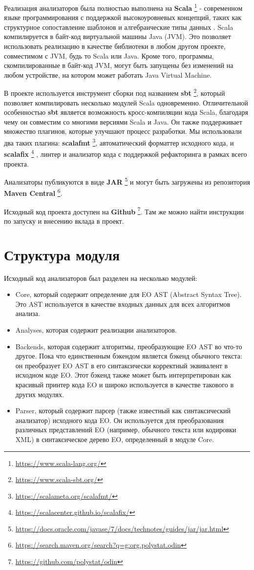 Реализация анализаторов была полностью выполнена на \textbf{Scala} \footnote{\url{https://www.scala-lang.org/}} - современном языке программирования с поддержкой высокоуровневых концепций, таких как структурное сопоставление шаблонов \cite{pattern_matching} и алгебраические типы данных \cite{adts}. Scala компилируется в байт-код виртуальной машины Java (JVM). Это позволяет использовать реализацию в качестве библиотеки в любом другом проекте, совместимом с JVM, будь то Scala или Java. Кроме того, программы, скомпилированные в байт-код JVM, могут быть запущены без изменений на любом устройстве, на котором может работать Java Virtual Machine.

В проекте используется инструмент сборки под названием \textbf{sbt} \footnote{\url{https://www.scala-sbt.org/}}, который позволяет компилировать несколько модулей Scala одновременно. Отличительной особенностью \textbf{sbt} является возможность кросс-компиляции кода Scala, благодаря чему он совместим со многими версиями Scala и Java. Он также поддерживает множество плагинов, которые улучшают процесс разработки. Мы использовали два таких плагина: \textbf{scalafmt} \footnote{\url{https://scalameta.org/scalafmt/}}, автоматический форматтер исходного кода, и \textbf{scalafix} \footnote{\url{https://scalacenter.github.io/scalafix/}} , линтер и анализатор кода с поддержкой рефакторинга в рамках всего проекта.

Анализаторы публикуются в виде \textbf{JAR} \footnote{\url{https://docs.oracle.com/javase/7/docs/technotes/guides/jar/jar.html}} и могут быть загружены из репозитория \textbf{Maven Central} \footnote{\url{https://search.maven.org/search?q=g:org.polystat.odin}}.

Исходный код проекта доступен на \textbf{Github} \footnote{\url{https://github.com/polystat/odin}}. Там же можно найти инструкции по запуску и внесению вклада в проект.


\section{Структура модуля}
\label{met:module_structure}
Исходный код анализаторов был разделен на несколько модулей:
\begin{itemize}
    \item Core, который содержит определение для EO AST (Abstract Syntax Tree).
          Это AST используется в качестве входных данных для всех алгоритмов анализа.
    \item Analyses, которая содержит реализации анализаторов.
    \item Backends, которая содержит алгоритмы, преобразующие EO AST во что-то другое. Пока что единственным бэкендом является бэкенд обычного текста: он преобразует EO AST в его синтаксически корректный эквивалент в исходном коде EO. Этот бэкенд также может быть интерпретирован как красивый принтер кода EO и широко используется в качестве такового в других модулях.
    \item Parser, который содержит парсер (также известный как синтаксический анализатор) исходного кода EO. Он используется для преобразования различных представлений EO (например, обычного текста или кодировки XML) в синтаксическое дерево EO, определенный в модуле Core.
\end{itemize}

